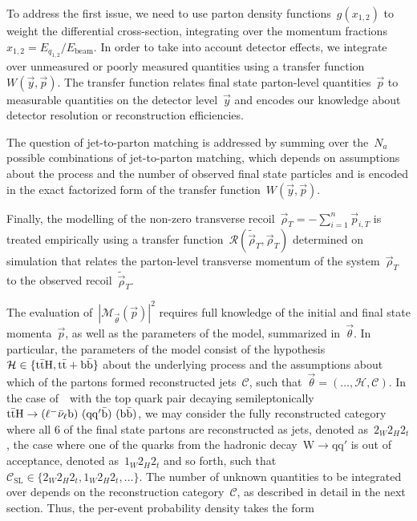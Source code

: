 To address the first issue, we need to use parton density functions~$g(x_{1,2})$ to weight the differential cross-section, integrating over the momentum fractions~$x_{1,2} = E_{q_{1,2}}/E_{\mathrm{beam}}$.
In order to take into account detector effects, we integrate over unmeasured or poorly measured quantities using a transfer function~$W(\vec{y}, \vec{p})$.
The transfer function relates final state parton-level quantities~$\vec{p}$ to measurable quantities on the detector level~$\vec{y}$ and encodes our knowledge about detector resolution or reconstruction efficiencies.

The question of jet-to-parton matching is addressed by summing over the~$N_a$ possible combinations of jet-to-parton matching, which depends on assumptions about the process and the number of observed final state particles and is encoded in the exact factorized form of the transfer function~$W(\vec{y}, \vec{p})$.

Finally, the modelling of the non-zero transverse recoil~$\vec{\rho}_T = -\sum_{i=1}^n \vec{p}_{i,T}$ is treated empirically using a transfer function~$\mathcal{R}(\tilde{\vec{\rho}}_T, \vec{\rho}_T)$ determined on simulation that relates the parton-level transverse momentum of the system~$\vec{\rho}_T$ to the observed recoil~$\tilde{\vec{\rho}}_T$. 

The evaluation of~$|\mathcal{M}_{\vec{\theta}}(\vec{p})|^2$ requires full knowledge of the initial and final state momenta~$\vec{p}$, as well as the parameters of the model, summarized in~$\vec{\theta}$. In particular, the parameters of the model consist of the hypothesis~$\mathcal{H} \in \{\mathrm{t} \bar{\mathrm{t}} \mathrm{H}, \mathrm{t} \bar{\mathrm{t}} + \mathrm{b}\bar{\mathrm{b}}\}$ about the underlying process and the assumptions about which of the partons formed reconstructed jets~$\mathcal{C}$, such that~$\vec{\theta} = (\dots, \mathcal{H}, \mathcal{C})$. In the case of~\ttH~with the top quark pair decaying semileptonically~$\mathrm{t} \bar{\mathrm{t}} \mathrm{H} \rightarrow (\ell^- \bar{\mathrm{\nu}}_\ell \mathrm{b})\ (\mathrm{q} \mathrm{q}' \bar{\mathrm{b}})\ (\mathrm{b} \bar{\mathrm{b}})$, we may consider the fully reconstructed category where all 6 of the final state partons are reconstructed as jets, denoted as~$2_W 2_H 2_t$, the case where one of the quarks from the hadronic decay~$\mathrm{W} \rightarrow \mathrm{q} \mathrm{q}'$ is out of acceptance, denoted as~$1_W 2_H 2_t$ and so forth, such that~$\mathcal{C}_{\mathrm{SL}} \in \{ 2_W 2_H 2_t, 1_W 2_H 2_t, \dots \}$. The number of unknown quantities to be integrated over depends on the reconstruction category~$\mathcal{C}$, as described in detail in the next section. 
Thus, the per-event probability density takes the form


